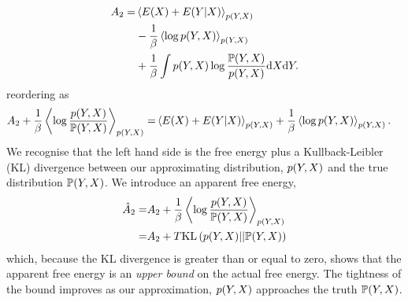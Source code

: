 \documentclass[]{article}
\begin{document}
\begin{align*}
A_2 = & \left\langle E(X) +E(Y | X) \right\rangle_{p(Y, X)} \\ 
& - \frac{1}{\beta} \left\langle \log p(Y, X) \right\rangle_{p(Y, X)} \\
& +\frac{1}{\beta} \int p(Y, X) \log \frac{\mathbb{P}(Y, X)}{p(Y, X)}\text{d}X \text{d}Y.
\end{align*}
 reordering as 
\begin{align*}
A_2 + \frac{1}{\beta} \left\langle \log \frac{p(Y, X)}{\mathbb{P}(Y, X)} \right\rangle_{p(Y, X) } = & \left\langle E(X) +E(Y | X) \right\rangle_{p(Y, X)} 
+ \frac{1}{\beta} \left\langle \log p(Y, X) \right\rangle_{p(Y, X)}.
\end{align*}
We recognise that the left hand side is the free energy plus a
Kullback-Leibler (KL) divergence between our approximating distribution,
\(p(Y, X)\) and the true distribution
\(\mathbb{P}(Y, X)\). We introduce an
apparent free energy, 
\begin{align*}
\hat{A}_2 = & A_2 + \frac{1}{\beta} \left\langle \log \frac{p(Y, X)}{\mathbb{P}(Y, X)} \right\rangle_{p(Y, X)} \\
= & A_2 + T \text{KL}\left(p(Y, X) || \mathbb{P}(Y, X)\right)
\end{align*}
 which, because the KL divergence is greater than or equal to zero,
shows that the apparent free energy is an \emph{upper bound} on the
actual free energy. The tightness of the bound improves as our
approximation, \(p(Y, X)\) approaches the
truth \(\mathbb{P}(Y, X)\).
\end{document}
